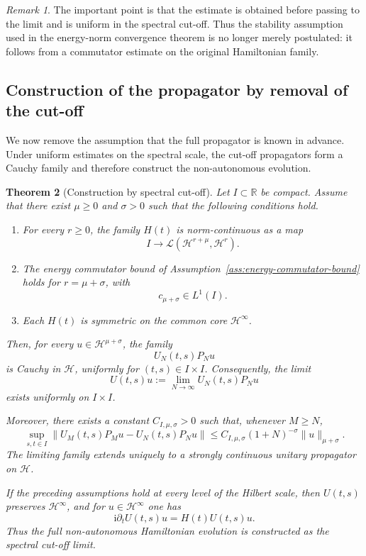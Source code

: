 \documentclass[11pt]{amsart}
\theoremstyle{plain}
\newtheorem{theorem}{Theorem}[section]
\theoremstyle{definition}
\theoremstyle{remark}
\newtheorem{remark}[theorem]{Remark}
\newcommand{\Hilb}{\mathcal H}
\newcommand{\ii}{\mathrm i}
\begin{document}
\begin{remark}
The important point is that the estimate is obtained before passing to the
limit and is uniform in the spectral cut-off. Thus the stability assumption
used in the energy-norm convergence theorem is no longer merely postulated:
it follows from a commutator estimate on the original Hamiltonian family.
\end{remark}


\subsection{Construction of the propagator by removal of the cut-off}
\label{subsec:constructive-propagator}

We now remove the assumption that the full propagator is known in advance.
Under uniform estimates on the spectral scale, the cut-off propagators form a
Cauchy family and therefore construct the non-autonomous evolution.

\begin{theorem}[Construction by spectral cut-off]
\label{thm:construction-by-spectral-cutoff}
Let \(I\subset\mathbb{R}\) be compact. Assume that there exist
\(\mu\geq 0\) and \(\sigma>0\) such that the following conditions hold.

\begin{enumerate}
\item For every \(r\geq 0\), the family \(H(t)\) is norm-continuous as a map
\[
I\longrightarrow
\mathcal{L}(\Hilb^{r+\mu},\Hilb^{r}).
\]

\item The energy commutator bound of
Assumption~\ref{ass:energy-commutator-bound} holds for
\(r=\mu+\sigma\), with
\[
c_{\mu+\sigma}\in L^{1}(I).
\]

\item Each \(H(t)\) is symmetric on the common core
\(\Hilb^{\infty}\).
\end{enumerate}

Then, for every \(u\in\Hilb^{\mu+\sigma}\), the family
\[
U_{N}(t,s)P_{N}u
\]
is Cauchy in \(\Hilb\), uniformly for \((t,s)\in I\times I\).
Consequently, the limit
\[
U(t,s)u
:=
\lim_{N\to\infty}U_{N}(t,s)P_{N}u
\]
exists uniformly on \(I\times I\).

Moreover, there exists a constant \(C_{I,\mu,\sigma}>0\) such that, whenever
\(M\geq N\),
\[
\sup_{s,t\in I}
\|U_{M}(t,s)P_{M}u-U_{N}(t,s)P_{N}u\|
\leq
C_{I,\mu,\sigma}(1+N)^{-\sigma}
\|u\|_{\mu+\sigma}.
\]
The limiting family extends uniquely to a strongly continuous unitary
propagator on \(\Hilb\).

If the preceding assumptions hold at every level of the Hilbert scale, then
\(U(t,s)\) preserves \(\Hilb^{\infty}\), and for
\(u\in\Hilb^{\infty}\) one has
\[
\ii\partial_{t}U(t,s)u
=
H(t)U(t,s)u.
\]
Thus the full non-autonomous Hamiltonian evolution is constructed as the
spectral cut-off limit.
\end{theorem}
\end{document}
